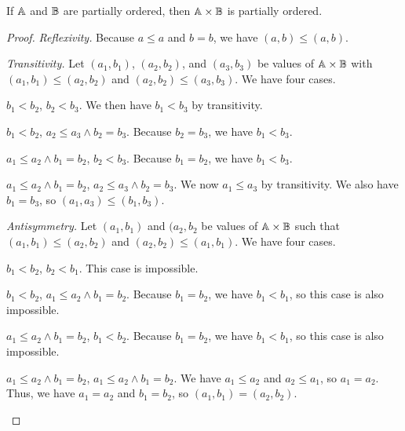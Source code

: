 \documentclass[../../math.tex]{subfiles}
\begin{document}
\begin{theorem}
    If $\mathbb{A}$ and $\mathbb{B}$ are partially ordered, then $\mathbb{A} \times \mathbb{B}$ is partially
    ordered.
\end{theorem}
\begin{proof}
    \textit{Reflexivity.}  Because $a \leq a$ and $b = b$, we have $(a, b) \leq
    (a, b)$.

    \textit{Transitivity.}  Let $(a_1, b_1)$, $(a_2, b_2)$, and $(a_3, b_3)$ be
    values of $\mathbb{A} \times \mathbb{B}$ with $(a_1, b_1) \leq (a_2, b_2)$ and $(a_2, b_2)
    \leq (a_3, b_3)$.  We have four cases.
    \begin{case}
        $b_1 < b_2$, $b_2 < b_3$.  We then have $b_1 < b_3$ by transitivity.
    \end{case}
    \begin{case}
        $b_1 < b_2$, $a_2 \leq a_3 \wedge b_2 = b_3$.  Because $b_2 = b_3$, we
        have $b_1 < b_3$.
    \end{case}
    \begin{case}
        $a_1 \leq a_2 \wedge b_1 = b_2$, $b_2 < b_3$.  Because $b_1 = b_2$, we
        have $b_1 < b_3$.
    \end{case}
    \begin{case}
        $a_1 \leq a_2 \wedge b_1 = b_2$, $a_2 \leq a_3 \wedge b_2 = b_3$.  We
        now $a_1 \leq a_3$ by transitivity.  We also have $b_1 = b_3$, so $(a_1,
        a_3) \leq (b_1, b_3)$.
    \end{case}

    \setcounter{case}{0}
    \textit{Antisymmetry.}  Let $(a_1, b_1)$ and $(a_2, b_2$ be values of $\mathbb{A}
    \times \mathbb{B}$ such that $(a_1, b_1) \leq (a_2, b_2)$ and $(a_2, b_2) \leq (a_1,
    b_1)$.  We have four cases.
    \begin{case}
        $b_1 < b_2$, $b_2 < b_1$.  This case is impossible.
    \end{case}
    \begin{case}
        $b_1 < b_2$, $a_1 \leq a_2 \wedge b_1 = b_2$.  Because $b_1 = b_2$, we
        have $b_1 < b_1$, so this case is also impossible.
    \end{case}
    \begin{case}
        $a_1 \leq a_2 \wedge b_1 = b_2$, $b_1 < b_2$.  Because $b_1 = b_2$, we
        have $b_1 < b_1$, so this case is also impossible.
    \end{case}
    \begin{case}
        $a_1 \leq a_2 \wedge b_1 = b_2$, $a_1 \leq a_2 \wedge b_1 = b_2$.  We
        have $a_1 \leq a_2$ and $a_2 \leq a_1$, so $a_1 = a_2$.  Thus, we have
        $a_1 = a_2$ and $b_1 = b_2$, so $(a_1, b_1) = (a_2, b_2)$.
    \end{case}
\end{proof}
\end{document}
